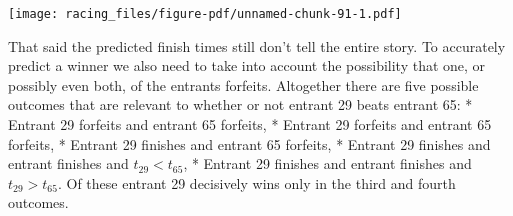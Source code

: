 \documentclass[
  letterpaper,
  DIV=11,
  numbers=noendperiod]{scrartcl}
\newenvironment{Shaded}{\begin{snugshade}}{\end{snugshade}}
\newcommand{\AttributeTok}[1]{\textcolor[rgb]{0.40,0.45,0.13}{#1}}
\newcommand{\ConstantTok}[1]{\textcolor[rgb]{0.56,0.35,0.01}{#1}}
\newcommand{\DecValTok}[1]{\textcolor[rgb]{0.68,0.00,0.00}{#1}}
\newcommand{\FloatTok}[1]{\textcolor[rgb]{0.68,0.00,0.00}{#1}}
\newcommand{\FunctionTok}[1]{\textcolor[rgb]{0.28,0.35,0.67}{#1}}
\newcommand{\NormalTok}[1]{\textcolor[rgb]{0.00,0.23,0.31}{#1}}
\newcommand{\SpecialCharTok}[1]{\textcolor[rgb]{0.37,0.37,0.37}{#1}}
\newcommand{\StringTok}[1]{\textcolor[rgb]{0.13,0.47,0.30}{#1}}
\begin{document}
\begin{Shaded}
\end{Shaded}

\texttt{[image: racing\_files/figure-pdf/unnamed-chunk-91-1.pdf]}

That said the predicted finish times still don't tell the entire story.
To accurately predict a winner we also need to take into account the
possibility that one, or possibly even both, of the entrants forfeits.
Altogether there are five possible outcomes that are relevant to whether
or not entrant 29 beats entrant 65: * Entrant 29 forfeits and entrant 65
forfeits, * Entrant 29 forfeits and entrant 65 forfeits, * Entrant 29
finishes and entrant 65 forfeits, * Entrant 29 finishes and entrant
finishes and \(t_{29} < t_{65}\), * Entrant 29 finishes and entrant
finishes and \(t_{29} > t_{65}\). Of these entrant 29 decisively wins
only in the third and fourth outcomes.
\end{document}
